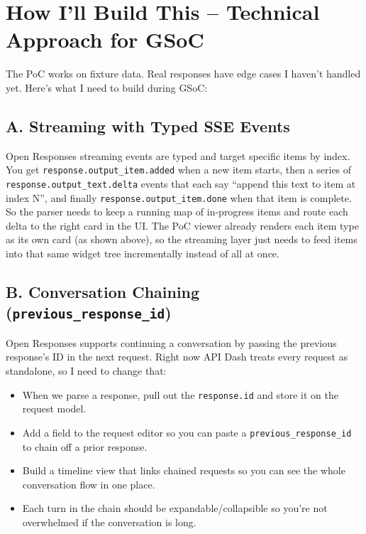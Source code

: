 \documentclass[11pt,a4paper]{article}
\begin{document}
\vspace{8pt}

\section{How I'll Build This -- Technical Approach for GSoC}

The PoC works on fixture data. Real responses have edge cases I haven't handled yet. Here's what I need to build during GSoC:

\subsection{A. Streaming with Typed SSE Events}

\begin{sloppypar}
Open Responses streaming events are typed and target specific items by index. You get \texttt{response.output\_item.added} when a new item starts, then a series of \texttt{response.output\_text.delta} events that each say ``append this text to item at index N'', and finally \texttt{response.output\_item.done} when that item is complete. So the parser needs to keep a running map of in-progress items and route each delta to the right card in the UI. The PoC viewer already renders each item type as its own card (as shown above), so the streaming layer just needs to feed items into that same widget tree incrementally instead of all at once.
\end{sloppypar}

\subsection{B. Conversation Chaining (\texttt{previous\_response\_id})}

Open Responses supports continuing a conversation by passing the previous response's ID in the next request. Right now API Dash treats every request as standalone, so I need to change that:

\begin{itemize}
  \item When we parse a response, pull out the \texttt{response.id} and store it on the request model.
  \item Add a field to the request editor so you can paste a \texttt{previous\_response\_id} to chain off a prior response.
  \item Build a timeline view that links chained requests so you can see the whole conversation flow in one place.
  \item Each turn in the chain should be expandable/collapsible so you're not overwhelmed if the conversation is long.
\end{itemize}
\end{document}
